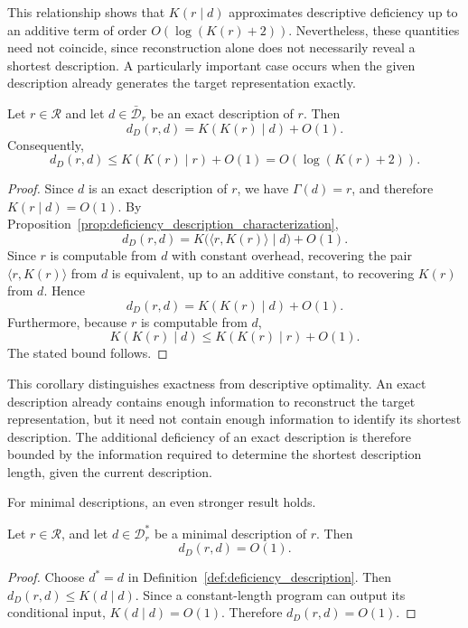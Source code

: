 This relationship shows that $K(r\mid d)$ approximates descriptive deficiency up to an additive term of order $O(\log(K(r)+2))$. Nevertheless, these quantities need not coincide, since reconstruction alone does not necessarily reveal a shortest description. A particularly important case occurs when the given description already generates the target representation exactly.

\begin{corollary}
\label{cor:deficiency_exact_description}
Let $r\in\mathcal R$ and let $d\in\bar{\mathcal D}_r$ be an exact description of $r$. Then
\[
d_D(r,d) = K(K(r)\mid d)+O(1).
\]
Consequently,
\[
d_D(r,d) \le K(K(r)\mid r)+O(1) = O(\log(K(r)+2)).
\]
\end{corollary}
\begin{proof}
Since $d$ is an exact description of $r$, we have $\Gamma(d)=r$, and therefore $K(r\mid d)=O(1)$. By Proposition~\ref{prop:deficiency_description_characterization},
\[
d_D(r,d) = K\bigl(\langle r,K(r)\rangle\mid d\bigr)+O(1).
\]
Since $r$ is computable from $d$ with constant overhead, recovering the pair $\langle r,K(r)\rangle$ from $d$ is equivalent, up to an additive constant, to recovering $K(r)$ from $d$. Hence
\[
d_D(r,d)=K(K(r)\mid d)+O(1).
\]
Furthermore, because $r$ is computable from $d$,
\[
K(K(r)\mid d)\le K(K(r)\mid r)+O(1).
\]
The stated bound follows.
\end{proof}

This corollary distinguishes exactness from descriptive optimality. An exact description already contains enough information to reconstruct the target representation, but it need not contain enough information to identify its shortest description. The additional deficiency of an exact description is therefore bounded by the information required to determine the shortest description length, given the current description.

For minimal descriptions, an even stronger result holds.

\begin{proposition}
\label{prop:minimal_description_has_small_deficiency}
Let $r\in\mathcal R$, and let $d\in\mathcal D_r^\ast$ be a
minimal description of $r$. Then
\[
d_D(r,d)=O(1).
\]
\end{proposition}
\begin{proof}
Choose $d^\ast=d$ in Definition~\ref{def:deficiency_description}. Then $d_D(r,d)\le K(d\mid d)$. Since a constant-length program can output its conditional input, $K(d\mid d)=O(1)$. Therefore $d_D(r,d)=O(1)$.
\end{proof}

